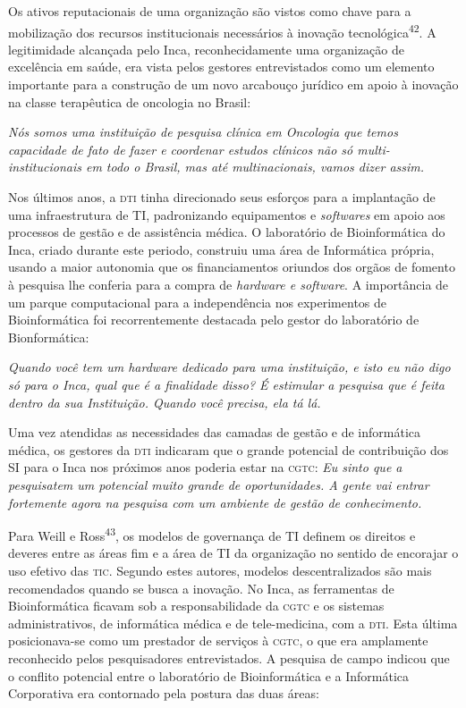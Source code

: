 \documentclass{article}
\begin{document}
Os ativos reputacionais de uma organização são vistos como chave para a
mobilização dos recursos institucionais necessários à inovação
tecnológica\textsuperscript{42}. A legitimidade alcançada pelo Inca, reconhecidamente uma organização de
excelência em saúde, era vista pelos gestores entrevistados como um elemento
importante para a construção de um novo arcabouço jurídico em apoio à inovação
na classe terapêutica de oncologia no Brasil:

\textit{Nós somos uma instituição de pesquisa clínica em Oncologia que temos
capacidade de fato de fazer e coordenar estudos clínicos não só
multi-institucionais em todo o Brasil, mas até multinacionais, vamos dizer
assim.}

Nos últimos anos, a \textsc{dti} tinha direcionado seus esforços para a implantação de
uma infraestrutura de TI, padronizando equipamentos e \textit{softwares}
em apoio aos processos de gestão e de assistência médica. O laboratório de
Bioinformática do Inca, criado durante este periodo, construiu uma área de
Informática própria, usando a maior autonomia que os financiamentos oriundos dos
orgãos de fomento à pesquisa lhe conferia para a compra de \textit{hardware e
software}. A importância de um parque computacional para a independência nos experimentos
de Bioinformática foi recorrentemente destacada pelo gestor do laboratório de
Bionformática:

\textit{Quando você tem um hardware dedicado para uma instituição, e isto eu não
digo só para o Inca, qual que é a finalidade disso? É estimular a pesquisa que é
feita dentro da sua Instituição. Quando você precisa, ela tá lá.}

Uma vez atendidas as necessidades das camadas de gestão e de informática médica,
os gestores da \textsc{dti} indicaram que o grande potencial de contribuição dos SI para
o Inca nos próximos anos poderia estar na \textsc{cgtc}: \textit{Eu sinto que a
pesquisatem um potencial muito grande de oportunidades. A gente vai entrar
fortemente agora na pesquisa com um ambiente de gestão de conhecimento.}

Para Weill e Ross\textsuperscript{43}, os modelos de governança de TI definem os direitos e deveres entre as áreas
fim e a área de TI da organização no sentido de encorajar o uso efetivo das \textsc{tic}.
Segundo estes autores, modelos descentralizados são mais recomendados quando se
busca a inovação. No Inca, as ferramentas de Bioinformática ficavam sob a
responsabilidade da \textsc{cgtc} e os sistemas administrativos, de informática médica e
de tele-medicina, com a \textsc{dti}. Esta última posicionava-se como um prestador de
serviços à \textsc{cgtc}, o que era amplamente reconhecido pelos pesquisadores
entrevistados. A pesquisa de campo indicou que o conflito potencial entre o
laboratório de Bioinformática e a Informática Corporativa era contornado pela
postura das duas áreas:
\end{document}
